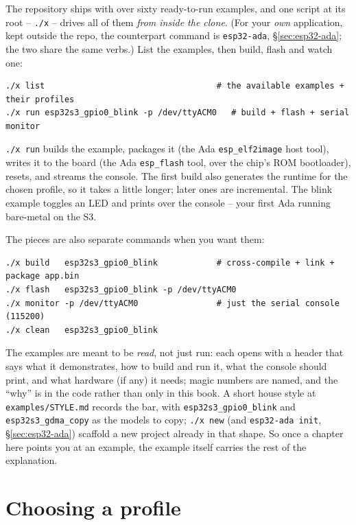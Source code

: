 The repository ships with over sixty ready-to-run examples, and one script at
its root -- \texttt{./x} -- drives all of them \emph{from inside the clone}. (For
your \emph{own} application, kept outside the repo, the counterpart command is
\texttt{esp32-ada}, \S\ref{sec:esp32-ada}; the two share the same verbs.) List the
examples, then build, flash and watch one:

\begin{lstlisting}[style=sh]
./x list                                   # the available examples + their profiles
./x run esp32s3_gpio0_blink -p /dev/ttyACM0   # build + flash + serial monitor
\end{lstlisting}

\texttt{./x run} builds the example, packages it (the Ada \texttt{esp\_elf2image}
host tool), writes it to the board (the Ada \texttt{esp\_flash} tool, over the
chip's ROM bootloader), resets, and streams the console. The first build also
generates the runtime for the chosen profile, so it takes a little longer; later
ones are incremental. The blink example toggles an LED and prints over the
console -- your first Ada running bare-metal on the S3.

The pieces are also separate commands when you want them:

\begin{lstlisting}[style=sh]
./x build   esp32s3_gpio0_blink            # cross-compile + link + package app.bin
./x flash   esp32s3_gpio0_blink -p /dev/ttyACM0
./x monitor -p /dev/ttyACM0                # just the serial console (115200)
./x clean   esp32s3_gpio0_blink
\end{lstlisting}

The examples are meant to be \emph{read}, not just run: each opens with a header
that says what it demonstrates, how to build and run it, what the console should
print, and what hardware (if any) it needs; magic numbers are named, and the
``why'' is in the code rather than only in this book. A short house style at
\texttt{examples/STYLE.md} records the bar, with \texttt{esp32s3\_gpio0\_blink}
and \texttt{esp32s3\_gdma\_copy} as the models to copy; \texttt{./x new} (and
\texttt{esp32-ada init}, \S\ref{sec:esp32-ada}) scaffold a new project already in
that shape. So once a chapter here points you at an example, the example itself
carries the rest of the explanation.

\section{Choosing a profile}

